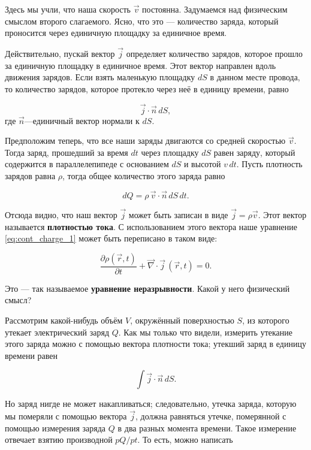 \documentclass[a4paper,12pt]{article}
\newcommand{\pt}{\partial}
\newcommand{\vn}{\vec{\nabla}}
\begin{document}
Здесь мы учли, что наша скорость $\vec{v}$ постоянна. Задумаемся над
физическим смыслом второго слагаемого. Ясно, что это — количество
заряда, который проносится через единичную площадку за единичное
время. 

Действительно, пускай вектор $\vec{j}$ определяет количество зарядов,
которое прошло за единичную площадку в единичное время. Этот вектор
направлен вдоль движения зарядов. Если взять маленькую площадку $dS$ в
данном месте провода, то количество зарядов, которое протекло через
неё в единицу времени, равно

\begin{equation}
  \label{eq:def_j_1}
  \vec{j} \cdot \vec{n}\, dS,
\end{equation}
где $\vec{n}$---единичный вектор нормали к $dS$. 

Предположим теперь, что все наши заряды двигаются со средней скоростью
$\vec{v}$. Тогда заряд, прошедший за время $dt$ через площадку $dS$
равен заряду, который содержится в параллелепипеде с основанием $dS$ и
высотой $v\, dt$. Пусть плотность зарядов равна $\rho$, тогда общее
количество этого заряда равно

\begin{equation}
  \label{eq:def_j_2}
  dQ = \rho \, \vec{v} \cdot \vec{n} \, dS\, dt.
\end{equation}

Отсюда видно, что наш вектор $\vec{j}$ может быть записан в виде
$\vec{j} = \rho \vec{v}$. Этот вектор называется \textbf{плотностью
  тока}. С использованием этого вектора наше уравнение
\eqref{eq:cont_charge_1} может быть переписано в таком виде: 

\begin{equation}
  \label{eq:cont_charge_2}
  \frac{\pt \rho (\vec{r},t)}{\pt t} + \vn \cdot \vec{j} \,(\vec{r},t)=0.
\end{equation}

Это — так называемое \textbf{уравнение неразрывности}. Какой у него
физический смысл? 

Рассмотрим какой-нибудь объём $V$, окружённый поверхностью $S$, из
которого утекает электрический заряд $Q$. Как мы только что видели,
измерить утекание этого заряда можно с помощью вектора плотности тока;
утекший заряд в единицу времени равен 

\begin{equation}
  \label{eq:phys_j_1}
  \int \vec{j} \cdot \vec{n}\, dS. 
\end{equation}

Но заряд нигде не может накапливаться; следовательно, утечка заряда,
которую мы померяли с помощью вектора $\vec{j}$, должна равняться
утечке, померянной с помощью измерения заряда $Q$ в два разных момента
времени. Такое измерение отвечает взятию производной $pQ/pt$. То есть,
можно написать
\end{document}
